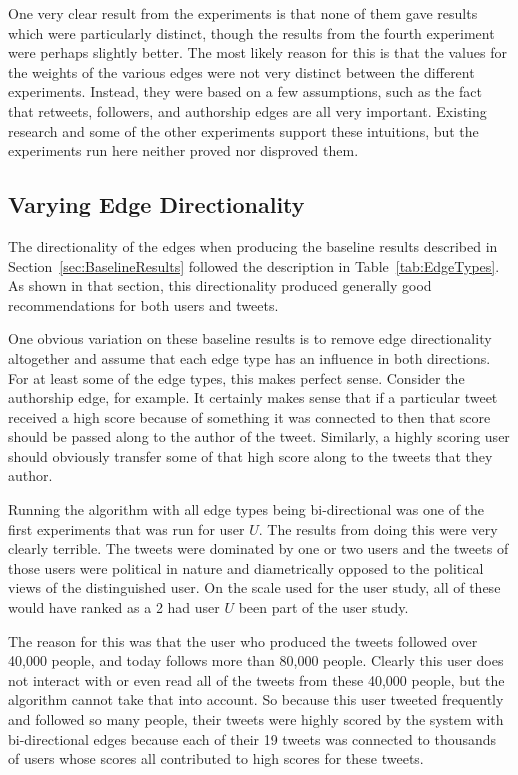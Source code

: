 One very clear result from the experiments is that none of them gave results which were particularly distinct, though the results from the fourth experiment were perhaps slightly better. The most likely reason for this is that the values for the weights of the various edges were not very distinct between the different experiments. Instead, they were based on a few assumptions, such as the fact that retweets, followers, and authorship edges are all very important. Existing research and some of the other experiments support these intuitions, but the experiments run here neither proved nor disproved them.


\subsection{Varying Edge Directionality}
\label{sec:VaryingEdgeDirectionality}

The directionality of the edges when producing the baseline results described in Section~\ref{sec:BaselineResults} followed the description in Table~\ref{tab:EdgeTypes}. As shown in that section, this directionality produced generally good recommendations for both users and tweets.

One obvious variation on these baseline results is to remove edge directionality altogether and assume that each edge type has an influence in both directions. For at least some of the edge types, this makes perfect sense. Consider the authorship edge, for example. It certainly makes sense that if a particular tweet received a high score because of something it was connected to then that score should be passed along to the author of the tweet. Similarly, a highly scoring user should obviously transfer some of that high score along to the tweets that they author.

Running the algorithm with all edge types being bi-directional was one of the first experiments that was run for user $U$. The results from doing this were very clearly terrible. The tweets were dominated by one or two users and the tweets of those users were political in nature and diametrically opposed to the political views of the distinguished user. On the scale used for the user study, all of these would have ranked as a 2 had user $U$ been part of the user study.

The reason for this was that the user who produced the tweets followed over 40,000 people, and today follows more than 80,000 people. Clearly this user does not interact with or even read all of the tweets from these 40,000 people, but the algorithm cannot take that into account. So because this user tweeted frequently and followed so many people, their tweets were highly scored by the system with bi-directional edges because each of their 19 tweets was connected to thousands of users whose scores all contributed to high scores for these tweets.

